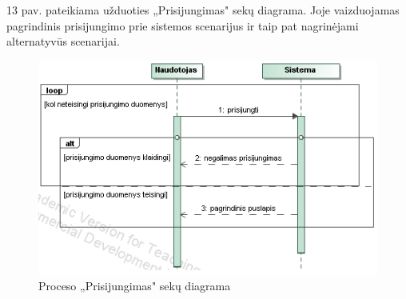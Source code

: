 \documentclass{VUMIFPSkursinis}
\begin{document}
13 pav. pateikiama užduoties „Prisijungimas" sekų diagrama. Joje vaizduojamas pagrindinis prisijungimo prie sistemos scenarijus ir taip pat nagrinėjami alternatyvūs scenarijai.
\begin{figure}[H]
\centering
\includegraphics[scale=1, frame]{img/prisijungimas.png}
\caption{Proceso „Prisijungimas" sekų diagrama}
\end{figure}
\end{document}
